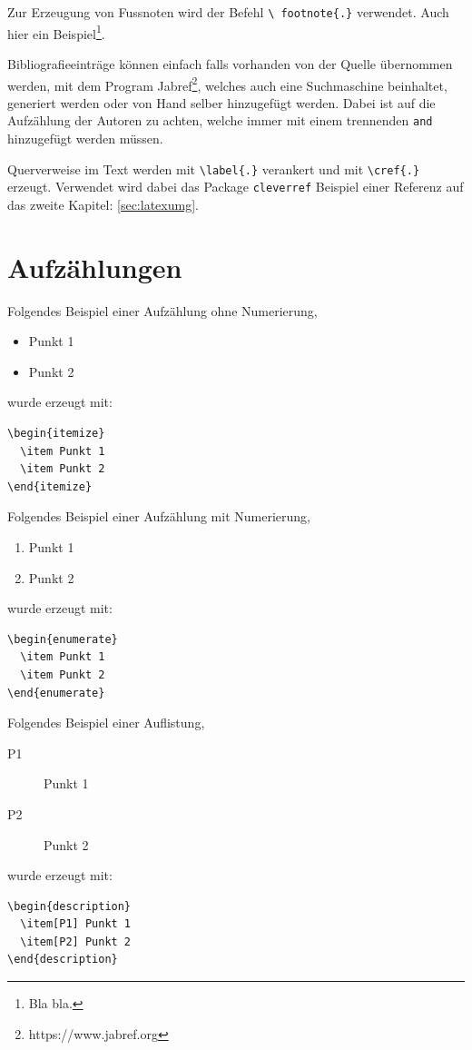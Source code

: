 Zur Erzeugung von Fussnoten wird der Befehl \texttt{\textbackslash
footnote\{.\}} verwendet. Auch hier ein Beispiel\footnote{Bla
bla.}.

Bibliografieeinträge können einfach falls vorhanden von der Quelle übernommen werden, mit dem Program Jabref\footnote{https://www.jabref.org}, welches auch eine Suchmaschine beinhaltet, generiert werden oder von Hand selber hinzugefügt werden. Dabei ist auf die Aufzählung der Autoren zu achten, welche immer mit einem trennenden \texttt{and} hinzugefügt werden müssen. 

Querverweise im Text werden mit \texttt{\textbackslash label\{.\}}
verankert und mit \texttt{\textbackslash cref\{.\}} erzeugt. Verwendet wird dabei das Package \texttt{cleverref}
Beispiel einer Referenz auf das zweite Kapitel:
\cref{sec:latexumg}.


\section{Aufzählungen}\label{sec:aufz}

Folgendes Beispiel einer Aufzählung ohne Numerierung,
\begin{itemize}
  \item Punkt 1
  \item Punkt 2
\end{itemize}
wurde erzeugt mit:
\begin{verbatim}
\begin{itemize}
  \item Punkt 1
  \item Punkt 2
\end{itemize}
\end{verbatim}

Folgendes Beispiel einer Aufzählung mit Numerierung,
\begin{enumerate}
  \item Punkt 1
  \item Punkt 2
\end{enumerate}
wurde erzeugt mit:
\begin{verbatim}
\begin{enumerate}
  \item Punkt 1
  \item Punkt 2
\end{enumerate}
\end{verbatim}

Folgendes Beispiel einer Auflistung,
\begin{description}
  \item[P1] Punkt 1
  \item[P2] Punkt 2
\end{description}
wurde erzeugt mit:
\begin{verbatim}
\begin{description}
  \item[P1] Punkt 1
  \item[P2] Punkt 2
\end{description}
\end{verbatim}


